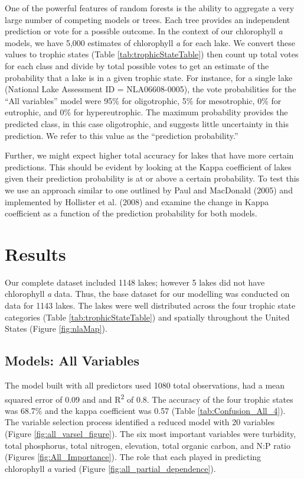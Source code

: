 \documentclass[12pt,]{article}
\begin{document}
One of the powerful features of random forests is the ability to
aggregate a very large number of competing models or trees. Each tree
provides an independent prediction or vote for a possible outcome. In
the context of our chlorophyll \emph{a} models, we have 5,000 estimates
of chlorophyll \emph{a} for each lake. We convert these values to
trophic states (Table \ref {tab:trophicStateTable}) then count up total
votes for each class and divide by total possible votes to get an
estimate of the probability that a lake is in a given trophic state. For
instance, for a single lake (National Lake Assessment ID =
NLA06608-0005), the vote probabilities for the ``All variables'' model
were 95\% for oligotrophic, 5\% for mesotrophic, 0\% for eutrophic, and
0\% for hypereutrophic. The maximum probability provides the predicted
class, in this case oligotrophic, and suggests little uncertainty in
this prediction. We refer to this value as the ``prediction
probability.''

Further, we might expect higher total accuracy for lakes that have more
certain predictions. This should be evident by looking at the Kappa
coefficient of lakes given their prediction probability is at or above a
certain probability. To test this we use an approach similar to one
outlined by Paul and MacDonald (2005) and implemented by Hollister et
al. (2008) and examine the change in Kappa coefficient as a function of
the prediction probability for both models.

\section{Results}\label{results}

Our complete dataset included 1148 lakes; however 5 lakes did not have
chlorophyll \emph{a} data. Thus, the base dataset for our modelling was
conducted on data for 1143 lakes. The lakes were well distributed across
the four trophic state categories (Table \ref{tab:trophicStateTable})
and spatially throughout the United States (Figure \ref{fig:nlaMap}).

\subsection{Models: All Variables}\label{models-all-variables}

The model built with all predictors used 1080 total observations, had a
mean squared error of 0.09 and and R\textsuperscript{2} of 0.8. The
accuracy of the four trophic states was 68.7\% and the kappa coefficient
was 0.57 (Table \ref{tab:Confusion_All_4}). The variable selection
process identified a reduced model with 20 variables (Figure
\ref{fig:all_varsel_figure}). The six most important variables were
turbidity, total phosphorus, total nitrogen, elevation, total organic
carbon, and N:P ratio (Figures \ref{fig:All_Importance}). The role that
each played in predicting chlorophyll \emph{a} varied (Figure
\ref{fig:all_partial_dependence}).
\end{document}
